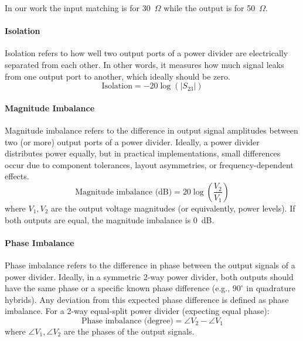In our work the input matching is for 30~$\Omega$ while the output is for 50~$\Omega$.

\paragraph{Isolation}

Isolation refers to how well two output ports of a power divider are electrically separated from each other. In other words, it measures how much signal leaks from one output port to another, which ideally should be zero.
\begin{equation}
\text{Isolation} = -20\log\left(|S_{23}|\right)
\end{equation}

\paragraph{Magnitude Imbalance}

Magnitude imbalance refers to the difference in output signal amplitudes between two (or more) output ports of a power divider. Ideally, a power divider distributes power equally, but in practical implementations, small differences occur due to component tolerances, layout asymmetries, or frequency-dependent effects.
\begin{equation}
\text{Magnitude imbalance (dB)} = 20\log\left(\frac{V_2}{V_1}\right)
\end{equation}
where $V_1, V_2$ are the output voltage magnitudes (or equivalently, power levels). If both outputs are equal, the magnitude imbalance is 0~dB.

\paragraph{Phase Imbalance}

Phase imbalance refers to the difference in phase between the output signals of a power divider. Ideally, in a symmetric 2-way power divider, both outputs should have the same phase or a specific known phase difference (e.g., $90^\circ$ in quadrature hybrids). Any deviation from this expected phase difference is defined as phase imbalance. For a 2-way equal-split power divider (expecting equal phase):
\begin{equation}
\text{Phase imbalance (degree)} = \angle V_2 - \angle V_1
\end{equation}
where $\angle V_1, \angle V_2$ are the phases of the output signals.

